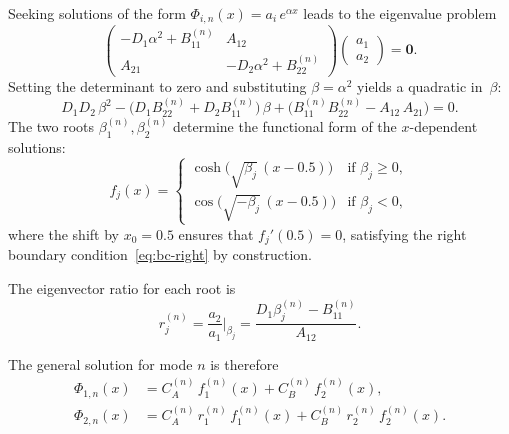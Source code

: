 Seeking solutions of the form $\Phi_{i,n}(x) = a_i\,e^{\alpha x}$ leads to the eigenvalue problem
\begin{equation}
  \begin{pmatrix}
    -D_1\alpha^2 + B_{11}^{(n)} & A_{12} \\[2pt]
    A_{21} & -D_2\alpha^2 + B_{22}^{(n)}
  \end{pmatrix}
  \begin{pmatrix} a_1 \\ a_2 \end{pmatrix} = \mathbf{0}.
  \label{eq:eigenvalue-system}
\end{equation}
Setting the determinant to zero and substituting $\beta = \alpha^2$ yields a quadratic in~$\beta$:
\begin{equation}
  D_1 D_2\,\beta^2
  - \bigl(D_1 B_{22}^{(n)} + D_2 B_{11}^{(n)}\bigr)\,\beta
  + \bigl(B_{11}^{(n)} B_{22}^{(n)} - A_{12}\,A_{21}\bigr)
  = 0.
  \label{eq:characteristic}
\end{equation}
The two roots $\beta_1^{(n)}, \beta_2^{(n)}$ determine the functional form of the $x$-dependent solutions:
\begin{equation}
  f_j(x) =
  \begin{cases}
    \cosh\!\bigl(\!\sqrt{\beta_j}\,(x - 0.5)\bigr)
      & \text{if } \beta_j \geq 0, \\[4pt]
    \cos\!\bigl(\!\sqrt{-\beta_j}\,(x - 0.5)\bigr)
      & \text{if } \beta_j < 0,
  \end{cases}
  \label{eq:basis-functions}
\end{equation}
where the shift by $x_0 = 0.5$ ensures that $f_j'(0.5) = 0$, satisfying the right boundary condition~\eqref{eq:bc-right} by construction.

The eigenvector ratio for each root is
\begin{equation}
  r_j^{(n)} = \frac{a_2}{a_1}\bigg|_{\beta_j}
  = \frac{D_1\beta_j^{(n)} - B_{11}^{(n)}}{A_{12}}.
  \label{eq:eigenvector-ratio}
\end{equation}

The general solution for mode $n$ is therefore
\begin{align}
  \Phi_{1,n}(x) &= C_A^{(n)}\,f_1^{(n)}(x) + C_B^{(n)}\,f_2^{(n)}(x),
  \label{eq:phi1n} \\
  \Phi_{2,n}(x) &= C_A^{(n)}\,r_1^{(n)}\,f_1^{(n)}(x)
                  + C_B^{(n)}\,r_2^{(n)}\,f_2^{(n)}(x).
  \label{eq:phi2n}
\end{align}

